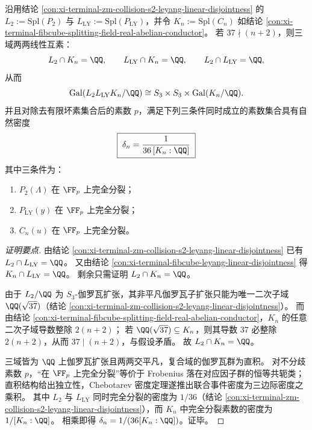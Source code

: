 \begin{conclusion}\label{con:xi-terminal-zm-collision-leyang-fibcube-chebotarev-triple-product}
沿用结论 \ref{con:xi-terminal-zm-collision-s2-leyang-linear-disjointness} 的 \(L_2:=\mathrm{Spl}(P_2)\) 与 \(L_{\mathrm{LY}}:=\mathrm{Spl}(P_{\mathrm{LY}})\)，并令 \(K_n:=\mathrm{Spl}(C_n)\) 如结论 \ref{con:xi-terminal-fibcube-splitting-field-real-abelian-conductor}。
若 \(37\nmid (n+2)\)，则三域两两线性互素：
\[
L_2\cap K_n=\QQ,\qquad
L_{\mathrm{LY}}\cap K_n=\QQ,\qquad
L_2\cap L_{\mathrm{LY}}=\QQ,
\]
从而
\[
\mathrm{Gal}(L_2L_{\mathrm{LY}}K_n/\QQ)\cong S_3\times S_3\times \mathrm{Gal}(K_n/\QQ).
\]
并且对除去有限坏素集合后的素数 \(p\)，满足下列三条件同时成立的素数集合具有自然密度
\[
\boxed{\;\delta_n=\frac{1}{36\,[K_n:\QQ]}\;}
\]
其中三条件为：
\begin{enumerate}
  \item \(P_2(\Lambda)\) 在 \(\FF_p\) 上完全分裂；
  \item \(P_{\mathrm{LY}}(y)\) 在 \(\FF_p\) 上完全分裂；
  \item \(C_n(u)\) 在 \(\FF_p\) 上完全分裂。
\end{enumerate}
\end{conclusion}
\begin{proof}[证明要点]
由结论 \ref{con:xi-terminal-zm-collision-s2-leyang-linear-disjointness} 已有 \(L_2\cap L_{\mathrm{LY}}=\QQ\)。
又由结论 \ref{con:xi-terminal-fibcube-leyang-linear-disjointness} 得 \(K_n\cap L_{\mathrm{LY}}=\QQ\)。
剩余只需证明 \(L_2\cap K_n=\QQ\)。
\par
由于 \(L_2/\QQ\) 为 \(S_3\)-伽罗瓦扩张，其非平凡伽罗瓦子扩张只能为唯一二次子域 \(\QQ(\sqrt{37})\)（结论 \ref{con:xi-terminal-zm-collision-s2-leyang-linear-disjointness}）。
而由结论 \ref{con:xi-terminal-fibcube-splitting-field-real-abelian-conductor}，\(K_n\) 的任意二次子域导数整除 \(2(n+2)\)；
若 \(\QQ(\sqrt{37})\subseteq K_n\)，则其导数 \(37\) 必整除 \(2(n+2)\)，从而 \(37\mid(n+2)\)，与假设矛盾。
故 \(L_2\cap K_n=\QQ\)。
\par
三域皆为 \(\QQ\) 上伽罗瓦扩张且两两交平凡，复合域的伽罗瓦群为直积。
对不分歧素数 \(p\)，“在 \(\FF_p\) 上完全分裂”等价于 Frobenius 落在对应因子群的恒等共轭类；
直积结构给出独立性，Chebotarev 密度定理遂推出联合事件密度为三边际密度之乘积。
其中 \(L_2\) 与 \(L_{\mathrm{LY}}\) 同时完全分裂的密度为 \(1/36\)（结论 \ref{con:xi-terminal-zm-collision-s2-leyang-linear-disjointness}），而 \(K_n\) 中完全分裂素数的密度为 \(1/[K_n:\QQ]\)。
相乘即得 \(\delta_n=1/(36[K_n:\QQ])\)。证毕。
\end{proof}

